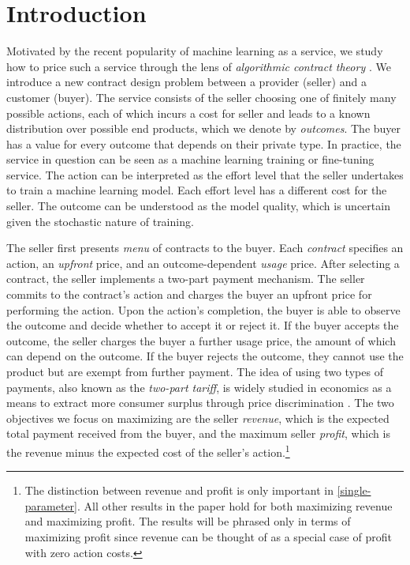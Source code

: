 \section{Introduction} \label{introduction}

Motivated by the recent popularity of machine learning as a service, we study how to price such a service through the lens of \emph{algorithmic contract theory} \citep{dutting2024algorithmic}. We introduce a new contract design problem between a provider (seller) and a customer (buyer). The service consists of the seller choosing one of finitely many possible actions, each of which incurs a cost for seller and leads to a known distribution over possible end products, which we denote by \emph{outcomes}. The buyer has a value for every outcome that depends on their private type. In practice, the service in question can be seen as a machine learning training or fine-tuning service. The action can be interpreted as the effort level that the seller undertakes to train a machine learning model. Each effort level has a different cost for the seller. The outcome can be understood as the model quality, which is uncertain given the stochastic nature of training.

The seller first presents \emph{menu} of contracts to the buyer. Each \emph{contract} specifies an action, an \emph{upfront} price, and an outcome-dependent \emph{usage} price. After selecting a contract, the seller implements a two-part payment mechanism. The seller commits to the contract's action and charges the buyer an upfront price for performing the action. Upon the action's completion, the buyer is able to observe the outcome and decide whether to accept it or reject it. If the buyer accepts the outcome, the seller charges the buyer a further usage price, the amount of which can depend on the outcome. If the buyer rejects the outcome, they cannot use the product but are exempt from further payment. The idea of using two types of payments, also known as the \emph{two-part tariff}, is widely studied in economics as a means to extract more consumer surplus through price discrimination \citep{hayes1987competition, schlereth2010optimization, leland1976monopoly, armstrong2011competitive, murphy_price_1977, danaher_optimal_2002}. The two objectives we focus on maximizing are the seller \emph{revenue}, which is the expected total payment received from the buyer, and the maximum seller \emph{profit}, which is the revenue minus the expected cost of the seller's action.\footnote{The distinction between revenue and profit is only important in \cref{single-parameter}. All other results in the paper hold for both maximizing revenue and maximizing profit. The results will be phrased only in terms of maximizing profit since revenue can be thought of as a special case of profit with zero action costs.}

